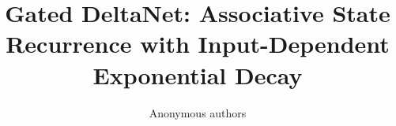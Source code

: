 \title{\textbf{Gated DeltaNet: Associative State Recurrence with Input-Dependent Exponential Decay}}

\author{Anonymous authors}
